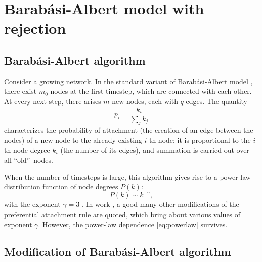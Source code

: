 \documentclass[aps,preprint]{revtex4}%
\begin{document}
\section{Barab\'{a}si-Albert model with rejection}

\subsection{Barab\'{a}si-Albert algorithm}

Consider a growing network. In the standard variant of Barab\'{a}si-Albert
model \cite{AlBa1}, there exist $m_{0}$ nodes at the first timestep, which are
connected with each other. At every next step, there arises $m$ new nodes,
each with $q$ edges. The quantity
\begin{equation}
p_{i}=\frac{k_{i}}{\sum\limits_{j}k_{j}}\label{Pi}%
\end{equation}
characterizes the probability of attachment (the creation of an edge between
the nodes) of a new node to the already existing $i$-th node; it is
proportional to the $i$-th node degree $k_{i}$ (the number of its edges), and
summation is carried out over all \textquotedblleft old\textquotedblright\ nodes.

When the number of timesteps is large, this algorithm gives rise to a
power-law distribution function of node degrees $P(k)$:%
\begin{equation}
P(k)\sim k^{-\gamma}, \label{eq:powerlaw}%
\end{equation}
with the exponent $\gamma=3$ \cite{AlBa1}. In work \cite{AlBa2}, a good many
other modifications of the preferential attachment rule are quoted, which
bring about various values of exponent $\gamma$. However, the power-law
dependence \eqref{eq:powerlaw} survives.

\subsection{Modification of Barab\'{a}si-Albert algorithm}
\end{document}
